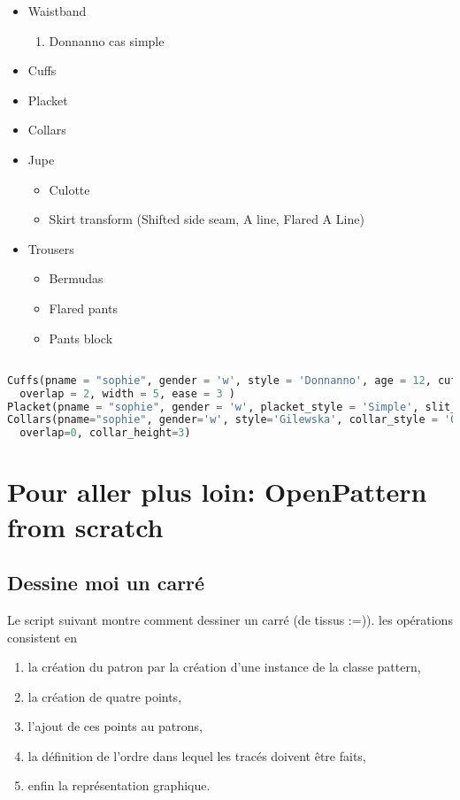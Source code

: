 \documentclass[10pt,a4paper,twoside]{report}
\begin{document}
\begin{itemize}
  \item Waistband
  \begin{enumerate}
  \item Donnanno cas simple
  \end{enumerate}
  \item Cuffs
  \item Placket
  \item Collars
  \item Jupe
  \begin{itemize}
  \item Culotte
  \item Skirt transform (Shifted side seam, A line, Flared A Line)
  \end{itemize}
  \item Trousers
  \begin{itemize}
  \item Bermudas
  \item Flared pants
  \item Pants block
  \end{itemize}
\end{itemize}

\begin{lstlisting}[language=python]

Cuffs(pname = "sophie", gender = 'w', style = 'Donnanno', age = 12, cuff_style = 'Simple',\
  overlap = 2, width = 5, ease = 3 )
Placket(pname = "sophie", gender = 'w', placket_style = 'Simple', slit_length = 10)
Collars(pname="sophie", gender='w', style='Gilewska', collar_style = 'Officer',\
  overlap=0, collar_height=3)

\end{lstlisting}

\chapter{Pour aller plus loin: OpenPattern from scratch}

\section{Dessine moi un carré}

Le script suivant montre comment dessiner un carré (de tissus :=)).
les opérations consistent en
\begin{enumerate}
  \item la création du patron par la création d'une instance de la classe pattern,
  \item la création de quatre points,
  \item l'ajout de ces points au patrons,
  \item la définition de l'ordre dans lequel les tracés doivent être faits,
  \item enfin la représentation graphique.
\end{enumerate}
\end{document}
